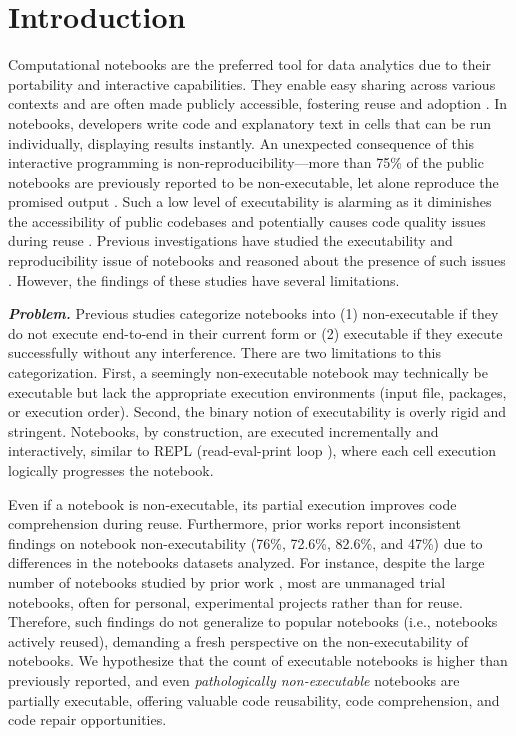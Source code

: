 \section{Introduction}
\label{sec:intro}

Computational notebooks are the preferred tool for data analytics due to their portability and interactive capabilities. They enable easy sharing across various contexts and are often made publicly accessible, fostering reuse and adoption \cite{jupyter2021collaboration, Quaranta2022}. In notebooks, developers write code and explanatory text in cells that can be run individually, displaying results instantly. An unexpected consequence of this interactive programming is non-reproducibility---more than 75\% of the public notebooks are previously reported to be non-executable, let alone reproduce the promised output \cite{Pimentel2019}. Such a low level of executability is alarming as it diminishes the accessibility of public codebases and potentially causes code quality issues during reuse \cite{reuseICPC2022}. Previous investigations have studied the executability and reproducibility issue of notebooks and reasoned about the presence of such issues \cite{Pimentel2019, Pimentel2021, Wang2021, Zhu2021, Head2019, Wang2020}. However, the findings of these studies have several limitations. 

\noindent\textbf{\em Problem.} Previous studies categorize notebooks into (1) non-executable if they do not execute end-to-end in their current form or (2) executable if they execute successfully without any interference. There are two limitations to this categorization. First, a seemingly non-executable notebook may technically be executable but lack the appropriate execution environments (input file, packages, or execution order). Second, the binary notion of executability is overly rigid and stringent. Notebooks, by construction, are executed incrementally and interactively, similar to REPL (read-eval-print loop \cite{REPL}), where each cell execution logically progresses the notebook. 

Even if a notebook is non-executable, its partial execution improves code comprehension during reuse. Furthermore, prior works report inconsistent findings on notebook non-executability (76\%\cite{Pimentel2019}, 72.6\%\cite{Wang2021}, 82.6\%\cite{Wang2020}, and 47\%\cite{Zhu2021}) due to differences in the notebooks datasets analyzed. For instance, despite the large number of notebooks studied by prior work \cite{Pimentel2019}, most are unmanaged trial notebooks, often for personal, experimental projects rather than for reuse. Therefore, such findings do not generalize to popular notebooks (i.e., notebooks actively reused), demanding a fresh perspective on the non-executability of notebooks. We hypothesize that the count of executable notebooks is higher than previously reported, and even {\em pathologically non-executable} notebooks are partially executable, offering valuable code reusability, code comprehension, and code repair opportunities.  


